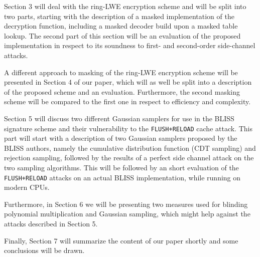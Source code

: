 Section 3 will deal with the ring-LWE encryption scheme and will be split into two parts, starting with the description of a masked implementation of the decryption function, including a masked decoder build upon a masked table lookup. The second part of this section will be an evaluation of the proposed implementation in respect to its soundness to first- and second-order side-channel attacks.

A different approach to masking of the \ac{ring-LWE} encryption scheme will be presented in Section 4 of our paper, which will as well be split into a description of the proposed scheme and an evaluation. Furthermore, the second masking scheme will be compared to the first one in respect to efficiency and complexity.

Section 5 will discuss two different Gaussian samplers for use in the BLISS signature scheme and their vulnerability to the \verb|FLUSH+RELOAD| cache attack. This part will start with a description of two Gaussian samplers proposed by the BLISS authors, namely the cumulative distribution function (CDT sampling) and rejection sampling, followed by the results of a perfect side channel attack on the two sampling algorithms. This will be followed by an short evaluation of the \verb|FLUSH+RELOAD| attacks on an actual BLISS implementation, while running on modern CPUs.

Furthermore, in Section 6 we will be presenting two measures used for blinding polynomial multiplication and Gaussian sampling, which might help against the attacks described in Section 5.

Finally, Section 7 will summarize the content of our paper shortly and some conclusions will be drawn.